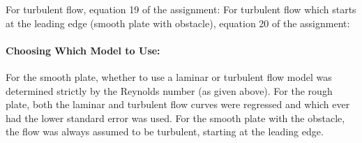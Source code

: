 \documentclass[12pt]{article}
\begin{document}
	\hfill\break
	For turbulent flow, equation 19 of the assignment:
	\hfill\break\break
	For turbulent flow which starts at the leading edge (smooth plate with obstacle), equation 20 of the assignment:
	
	\paragraph{Choosing Which Model to Use:} For the smooth plate, whether to use a laminar or turbulent flow model was determined strictly by the Reynolds number (as given above). For the rough plate, both the laminar and turbulent flow curves were regressed and which ever had the lower standard error was used. For the smooth plate with the obstacle, the flow was always assumed to be turbulent, starting at the leading edge.
	
	
\end{document}
